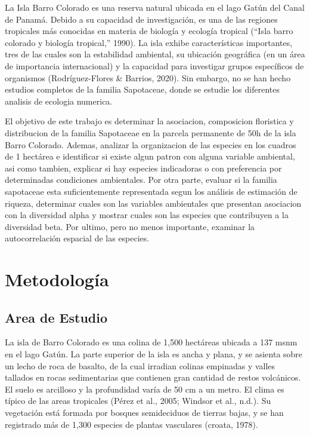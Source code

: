 \documentclass[11pt,]{article}
\begin{document}
La Isla Barro Colorado es una reserva natural ubicada en el lago Gatún
del Canal de Panamá. Debido a su capacidad de investigación, es una de
las regiones tropicales más conocidas en materia de biología y ecología
tropical (``Isla barro colorado y biología tropical,'' 1990). La isla
exhibe características importantes, tres de las cuales son la
estabilidad ambiental, su ubicación geográfica (en un área de
importancia internacional) y la capacidad para investigar grupos
específicos de organismos (Rodríguez-Flores \& Barrios, 2020). Sin
embargo, no se han hecho estudios completos de la familia Sapotaceae,
donde se estudie los diferentes analisis de ecologia numerica.

El objetivo de este trabajo es determinar la asociacion, composicion
floristica y distribucion de la familia Sapotaceae en la parcela
permanente de 50h de la isla Barro Colorado. Ademas, analizar la
organizacion de las especies en los cuadros de 1 hectárea e identificar
si existe algun patron con alguna variable ambiental, asi como tambien,
explicar si hay especies indicadoras o con preferencia por determinadas
condiciones ambientales. Por otra parte, evaluar si la familia
sapotaceae esta suficientemente representada segun los análisis de
estimación de riqueza, determinar cuales son las variables ambientales
que presentan asociacion con la diversidad alpha y mostrar cuales son
las especies que contribuyen a la diversidad beta. Por ultimo, pero no
menos importante, examinar la autocorrelación espacial de las especies.

\section{Metodología}\label{metodologuxeda}

\subsection{Area de Estudio}\label{area-de-estudio}

La isla de Barro Colorado es una colina de 1,500 hectáreas ubicada a 137
msnm en el lago Gatún. La parte superior de la isla es ancha y plana, y
se asienta sobre un lecho de roca de basalto, de la cual irradian
colinas empinadas y valles tallados en rocas sedimentarias que contienen
gran cantidad de restos volcánicos. El suelo es arcilloso y la
profundidad varía de 50 cm a un metro. El clima es típico de las areas
tropicales (Pérez et al., 2005; Windsor et al., n.d.). Su vegetación
está formada por bosques semideciduos de tierras bajas, y se han
registrado más de 1,300 especies de plantas vasculares (croata, 1978).
\end{document}
